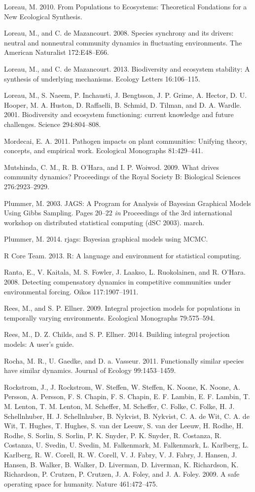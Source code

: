 \documentclass[12pt,]{article}
\begin{document}
Loreau, M. 2010. From Populations to Ecosystems: Theoretical Fondations
for a New Ecological Synthesis.

Loreau, M., and C. {{de Mazancourt}}. 2008. Species synchrony and its
drivers: neutral and nonneutral community dynamics in fluctuating
environments. The American Naturalist 172:E48--E66.

Loreau, M., and C. {{de Mazancourt}}. 2013. Biodiversity and ecosystem
stability: A synthesis of underlying mechanisms. Ecology Letters
16:106--115.

Loreau, M., S. Naeem, P. Inchausti, J. Bengtsson, J. P. Grime, A.
Hector, D. U. Hooper, M. A. Huston, D. Raffaelli, B. Schmid, D. Tilman,
and D. A. Wardle. 2001. Biodiversity and ecosystem functioning: current
knowledge and future challenges. Science 294:804--808.

Mordecai, E. A. 2011. Pathogen impacts on plant communities: Unifying
theory, concepts, and empirical work. Ecological Monographs 81:429--441.

Mutshinda, C. M., R. B. O'Hara, and I. P. Woiwod. 2009. What drives
community dynamics? Proceedings of the Royal Society B: Biological
Sciences 276:2923--2929.

Plummer, M. 2003. JAGS: A Program for Analysis of Bayesian Graphical
Models Using Gibbs Sampling. Pages 20--22 \emph{in} Proceedings of the
3rd international workshop on distributed statistical computing (dSC
2003). march.

Plummer, M. 2014. rjags: Bayesian graphical models using MCMC.

R Core Team. 2013. R: A language and environment for statistical
computing.

Ranta, E., V. Kaitala, M. S. Fowler, J. Laakso, L. Ruokolainen, and R.
O'Hara. 2008. Detecting compensatory dynamics in competitive communities
under environmental forcing. Oikos 117:1907--1911.

Rees, M., and S. P. Ellner. 2009. Integral projection models for
populations in temporally varying environments. Ecological Monographs
79:575--594.

Rees, M., D. Z. Childs, and S. P. Ellner. 2014. Building integral
projection models: A user's guide.

Rocha, M. R., U. Gaedke, and D. a. Vasseur. 2011. Functionally similar
species have similar dynamics. Journal of Ecology 99:1453--1459.

Rockstrom, J., J. Rockstrom, W. Steffen, W. Steffen, K. Noone, K. Noone,
A. Persson, A. Persson, F. S. Chapin, F. S. Chapin, E. F. Lambin, E. F.
Lambin, T. M. Lenton, T. M. Lenton, M. Scheffer, M. Scheffer, C. Folke,
C. Folke, H. J. Schellnhuber, H. J. Schellnhuber, B. Nykvist, B.
Nykvist, C. A. de Wit, C. A. de Wit, T. Hughes, T. Hughes, S. van der
Leeuw, S. van der Leeuw, H. Rodhe, H. Rodhe, S. Sorlin, S. Sorlin, P. K.
Snyder, P. K. Snyder, R. Costanza, R. Costanza, U. Svedin, U. Svedin, M.
Falkenmark, M. Falkenmark, L. Karlberg, L. Karlberg, R. W. Corell, R. W.
Corell, V. J. Fabry, V. J. Fabry, J. Hansen, J. Hansen, B. Walker, B.
Walker, D. Liverman, D. Liverman, K. Richardson, K. Richardson, P.
Crutzen, P. Crutzen, J. A. Foley, and J. A. Foley. 2009. A safe
operating space for humanity. Nature 461:472--475.
\end{document}
